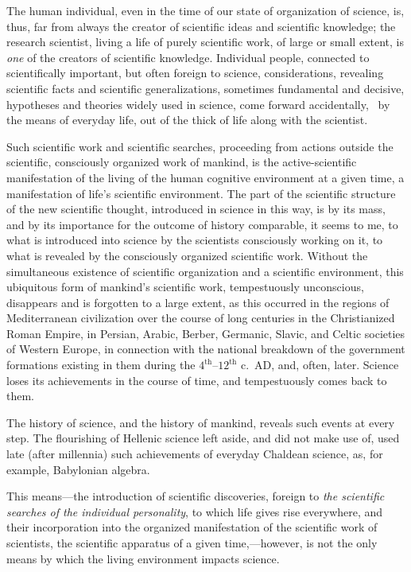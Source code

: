 The human individual, even in the time of our state of organization of science,
is, thus, far from always the creator of scientific ideas and scientific
knowledge; the research scientist, living a life of purely scientific work, of
large or small extent, is \emph{one} of the creators of scientific knowledge.
Individual people, connected to scientifically important, but often foreign to
science, considerations, revealing scientific facts and scientific
generalizations, sometimes fundamental and decisive, hypotheses and theories
widely used in science, come forward accidentally, \ie\ by the means of
everyday life, out of the thick of life along with the scientist.

Such scientific work and scientific searches, proceeding from actions outside
the scientific, consciously organized work of mankind, is the active-scientific
manifestation of the living of the human cognitive environment at a given time,
a manifestation of life's scientific environment.  The part of the scientific
structure of the new scientific thought, introduced in science in this way, is
by its mass, and by its importance for the outcome of history comparable, it
seems to me, to what is introduced into science by the scientists consciously
working on it, to what is revealed by the consciously organized scientific
work.  Without the simultaneous existence of scientific organization and a
scientific environment, this ubiquitous form of mankind's scientific work,
tempestuously unconscious, disappears and is forgotten to a large extent, as
this occurred in the regions of Mediterranean civilization over the course of
long centuries in the Christianized Roman Empire, in Persian, Arabic, Berber,
Germanic, Slavic, and Celtic societies of Western Europe, in connection with
the national breakdown of the government formations existing in them during the
$4^\mathrm{th}$--$12^\mathrm{th}$ c.\ AD, and, often, later.  Science loses its
achievements in the course of time, and tempestuously comes back to them.

The history of science, and the history of mankind, reveals such events at
every step.  The flourishing of Hellenic science left aside, and did not make
use of, used late (after millennia) such achievements of everyday Chaldean
science, as, for example, Babylonian algebra.


\Section %
This means---the introduction of scientific discoveries, foreign to \emph{the
scientific searches of the individual personality}, to which life gives rise
everywhere, and their incorporation into the organized manifestation of the
scientific work of scientists, the scientific apparatus of a given
time,---however, is not the only means by which the living environment impacts
science.

